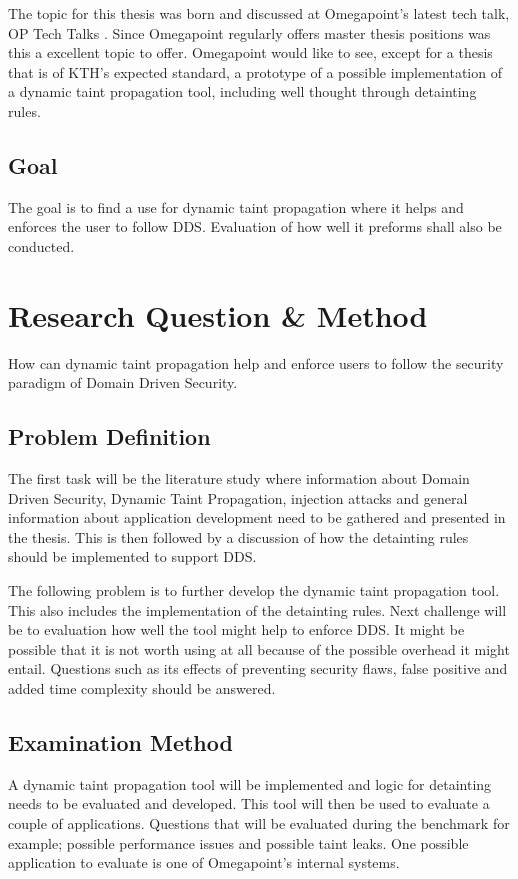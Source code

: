 \documentclass{../kththesis}
\begin{document}
The topic for this thesis was born and discussed at Omegapoint's latest tech talk, OP Tech Talks \parencite{Tardell}. Since Omegapoint regularly offers master thesis positions was this a excellent topic to offer. Omegapoint would like to see, except for a thesis that is of KTH's expected standard, a prototype of a possible implementation of a dynamic taint propagation tool, including well thought through detainting rules.


\section{Goal}
The goal is to find a use for dynamic taint propagation where it helps and enforces the user to follow DDS. Evaluation of how well it preforms shall also be conducted.



\chapter{Research Question \& Method}
How can dynamic taint propagation help and enforce users to follow the security paradigm of Domain Driven Security.


\section{Problem Definition}
The first task will be the literature study where information about Domain Driven Security, Dynamic Taint Propagation, injection attacks and general information about application development need to be gathered and presented in the thesis. This is then followed by a discussion of how the detainting rules should be implemented to support DDS. 

The following problem is to further develop the dynamic taint propagation tool. This also includes the implementation of the detainting rules. Next challenge will be to evaluation how well the tool might help to enforce DDS. It might be possible that it is not worth using at all because of the possible overhead it might entail. Questions such as its effects of preventing security flaws, false positive and added time complexity should be answered.


\section{Examination Method}
A dynamic taint propagation tool will be implemented and logic for detainting needs to be evaluated and developed. This tool will then be used to evaluate a couple of applications. Questions that will be evaluated during the benchmark for example; possible performance issues and possible taint leaks. One possible application to evaluate is one of Omegapoint's internal systems.
\end{document}
